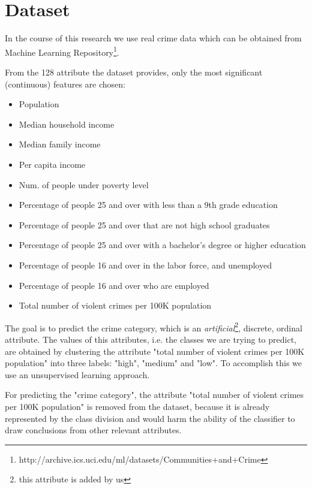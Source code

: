 \section{Dataset}

In the course of this research we use real crime data which can be obtained from Machine Learning Repository\footnote{http://archive.ics.uci.edu/ml/datasets/Communities+and+Crime}.

From the 128 attribute the dataset provides, only the most significant (continuous) features are chosen:

\begin{itemize}
	\setlength{\itemsep}{-2pt}
	\item Population
	\item Median household income
	\item Median family income
	\item Per capita income
	\item Num. of people under poverty level
	\item Percentage of people 25 and over with less than a 9th grade education
	\item Percentage of people 25 and over that are not high school graduates
	\item Percentage of people 25 and over with a bachelor’s degree or higher education
	\item Percentage of people 16 and over in the labor force, and unemployed
	\item Percentage of people 16 and over who are employed
	\item Total number of violent crimes per 100K population
\end{itemize}

The goal is to predict the crime category, which is an \textit{artificial}\footnote{this attribute is added by us}, discrete, ordinal attribute. The values of this attributes, i.e. the classes we are trying to predict,  are obtained by clustering the attribute "total number of violent crimes per 100K population" into three labels: "high", "medium" and "low". To accomplish this we use an unsupervised learning approach. 

For predicting the "crime category", the attribute "total number of violent crimes per 100K population" is removed from the dataset, because it is already represented by the class division and would harm the ability of the classifier to draw conclusions from other relevant attributes.